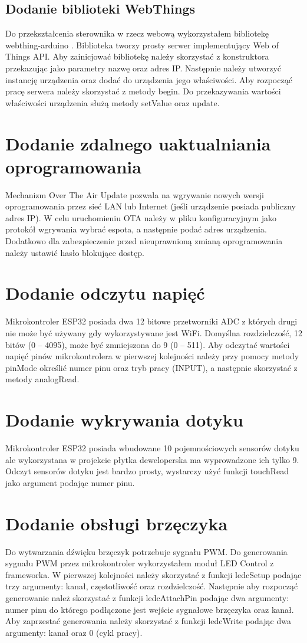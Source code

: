 \documentclass[11pt]{report}
\begin{document}
 \subsection{Dodanie biblioteki WebThings}
 Do przekształcenia sterownika w rzecz webową wykorzystałem bibliotekę webthing-arduino \cite{webthinglibrary}. Biblioteka tworzy prosty serwer implementujący Web of Things API.
 Aby zainicjować bibliotekę należy skorzystać z konstruktora przekazując jako parametry nazwę oraz adres IP. Następnie należy utworzyć instancję urządzenia oraz dodać do urządzenia jego właściwości. Aby rozpocząć pracę serwera należy skorzystać z metody begin. Do przekazywania wartości właściwości urządzenia służą metody setValue oraz update.
 
 \section{Dodanie zdalnego uaktualniania oprogramowania}
 Mechanizm Over The Air Update pozwala na wgrywanie nowych wersji oprogramowania przez sieć LAN lub Internet (jeśli urządzenie posiada publiczny adres IP). W celu uruchomieniu OTA należy w pliku konfiguracyjnym jako protokół wgrywania wybrać espota, a następnie podać adres urządzenia. Dodatkowo dla zabezpieczenie przed nieuprawnioną zmianą oprogramowania należy ustawić hasło blokujące dostęp.
 
 \section{Dodanie odczytu napięć}
 Mikrokontroler ESP32 posiada dwa 12 bitowe przetworniki ADC z których drugi nie może być używany gdy wykorzystywane jest WiFi. Domyślna rozdzielczość, 12 bitów (0 – 4095), może być zmniejszona do 9 (0 – 511).
 Aby odczytać wartości napięć pinów mikrokontrolera w pierwszej kolejności należy przy pomocy metody pinMode określić numer pinu oraz tryb pracy (INPUT), a następnie skorzystać z metody analogRead.
 
 \section{Dodanie wykrywania dotyku}
 Mikrokontroler ESP32 posiada wbudowane 10 pojemnościowych sensorów dotyku ale wykorzystana w projekcie płytka deweloperska ma wyprowadzone ich tylko 9. Odczyt sensorów dotyku jest bardzo prosty, wystarczy użyć funkcji touchRead jako argument podając numer pinu.
 
 \section{Dodanie obsługi brzęczyka}
 Do wytwarzania dźwięku brzęczyk potrzebuje sygnału PWM. Do generowania sygnału PWM przez mikrokontroler wykorzystałem moduł LED Control z frameworka. W pierwszej kolejności należy skorzystać z funkcji ledcSetup podając trzy argumenty: kanał, częstotliwość oraz rozdzielczość. Następnie aby rozpocząć generowanie należ skorzystać z funkcji ledcAttachPin podając dwa argumenty: numer pinu do którego podłączone jest wejście sygnałowe brzęczyka oraz kanał.
 Aby zaprzestać generowania należy skorzystać z funkcji ledcWrite podając dwa argumenty: kanał oraz 0 (cykl pracy).
 
\end{document}
